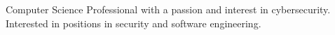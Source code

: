 

\begin{cvparagraph}

Computer Science Professional with a passion and interest in cybersecurity. Interested in positions in security and software engineering.

\end{cvparagraph}

